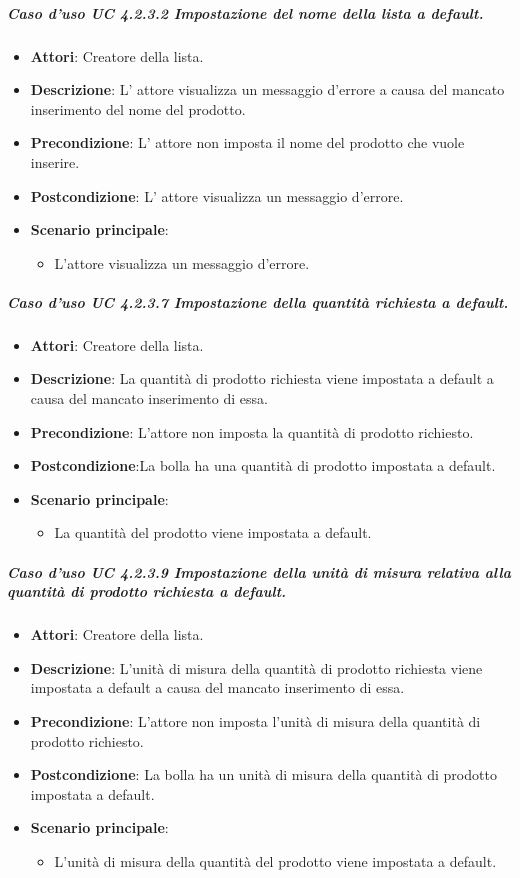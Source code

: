 \subparagraph{Caso d'uso UC 4.2.3.2 Impostazione del nome della lista a default.}
	\begin{itemize}
		\item\textbf{Attori}: Creatore della lista.
		\item\textbf{Descrizione}: L' attore visualizza un messaggio d'errore a causa del mancato inserimento del nome del prodotto.
		\item\textbf{Precondizione}: L' attore non imposta il nome del prodotto che vuole inserire.
		\item\textbf{Postcondizione}: L' attore visualizza un messaggio d'errore.
		\item\textbf{Scenario principale}:
			\begin{itemize}
				\item L'attore visualizza un messaggio d'errore. 
			\end{itemize}
		
	\end{itemize}
	
\subparagraph{Caso d'uso UC 4.2.3.7 Impostazione della quantità richiesta a default.}
	\begin{itemize}
		\item\textbf{Attori}: Creatore della lista.
		\item\textbf{Descrizione}: La quantità di prodotto richiesta viene impostata a default a causa del mancato inserimento di essa.
		\item\textbf{Precondizione}: L'attore non imposta la quantità di prodotto richiesto.
		\item\textbf{Postcondizione}:La bolla ha una quantità di prodotto impostata a default.
		\item\textbf{Scenario principale}:
			\begin{itemize}
				\item La quantità del prodotto viene impostata a default.
			\end{itemize}
		
	\end{itemize}
\subparagraph{Caso d'uso UC 4.2.3.9 Impostazione della unità di misura relativa alla quantità di prodotto richiesta a default.}
	\begin{itemize}
		\item\textbf{Attori}: Creatore della lista.
		\item\textbf{Descrizione}: L'unità di misura della quantità di prodotto richiesta viene impostata a default a causa del mancato inserimento di essa.
		\item\textbf{Precondizione}: L'attore non imposta l'unità di misura della quantità di prodotto richiesto.
		\item\textbf{Postcondizione}: La bolla ha un unità di misura della quantità di prodotto impostata a default.
		\item\textbf{Scenario principale}:
			\begin{itemize}
				\item L'unità di misura della quantità del prodotto viene impostata a default.
			\end{itemize}
		
\end{itemize}
	